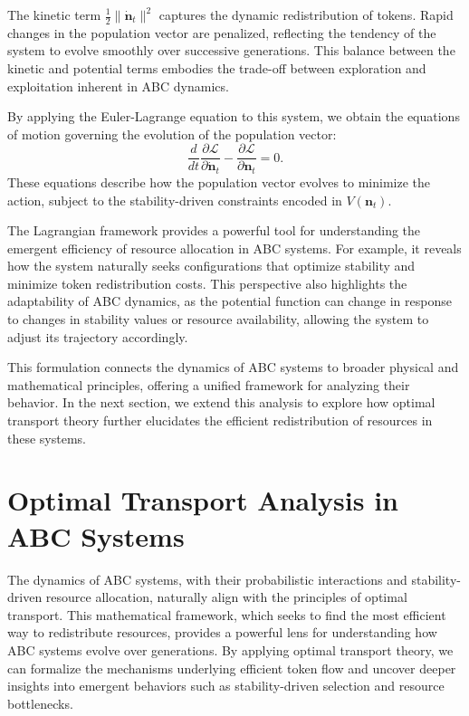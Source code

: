 \documentclass[%
 preprint, linenumbers,
 amsmath,amssymb,
 aps, physrev,
]{revtex4-2}
\begin{document}
The kinetic term $\frac{1}{2} \|\dot{\mathbf{n}}_t\|^2$ captures the dynamic redistribution of tokens. Rapid changes in the population vector are penalized, reflecting the tendency of the system to evolve smoothly over successive generations. This balance between the kinetic and potential terms embodies the trade-off between exploration and exploitation inherent in ABC dynamics.

By applying the Euler-Lagrange equation to this system, we obtain the equations of motion governing the evolution of the population vector:
\begin{equation}
\frac{d}{dt} \frac{\partial \mathcal{L}}{\partial \dot{\mathbf{n}}_t} - \frac{\partial \mathcal{L}}{\partial \mathbf{n}_t} = 0.
\end{equation}
These equations describe how the population vector evolves to minimize the action, subject to the stability-driven constraints encoded in $V(\mathbf{n}_t)$.

The Lagrangian framework provides a powerful tool for understanding the emergent efficiency of resource allocation in ABC systems. For example, it reveals how the system naturally seeks configurations that optimize stability and minimize token redistribution costs. This perspective also highlights the adaptability of ABC dynamics, as the potential function can change in response to changes in stability values or resource availability, allowing the system to adjust its trajectory accordingly.

This formulation connects the dynamics of ABC systems to broader physical and mathematical principles, offering a unified framework for analyzing their behavior. In the next section, we extend this analysis to explore how optimal transport theory further elucidates the efficient redistribution of resources in these systems.

\section{Optimal Transport Analysis in ABC Systems}

The dynamics of ABC systems, with their probabilistic interactions and stability-driven resource allocation, naturally align with the principles of optimal transport. This mathematical framework, which seeks to find the most efficient way to redistribute resources, provides a powerful lens for understanding how ABC systems evolve over generations. By applying optimal transport theory, we can formalize the mechanisms underlying efficient token flow and uncover deeper insights into emergent behaviors such as stability-driven selection and resource bottlenecks.
\end{document}
